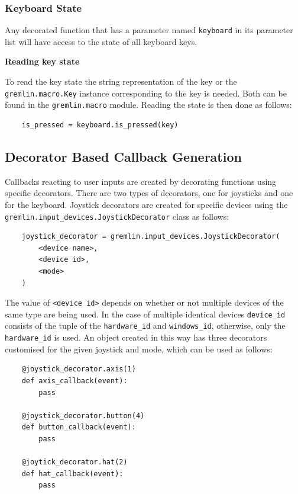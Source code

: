 \documentclass[a4, 10pt]{article}
\begin{document}
\subsubsection{Keyboard State}

Any decorated function that has a parameter named \verb+keyboard+ in its
parameter list will have access to the state of all keyboard keys.

\vspace{1em}
\noindent\textbf{Reading key state}

\noindent To read the key state the string representation of the key or
the \texttt{gremlin.macro.\allowbreak Key} instance corresponding to the
key is needed. Both can be found in the \texttt{gremlin.macro} module.
Reading the state is then done as follows:
\begin{verbatim}
    is_pressed = keyboard.is_pressed(key)
\end{verbatim}


\subsection{Decorator Based Callback Generation}

Callbacks reacting to user inputs are created by decorating functions
using specific decorators. There are two types of decorators, one for
joysticks and one for the keyboard. Joystick decorators are created for
specific devices using the\\
\verb+gremlin.input_devices.JoystickDecorator+ class as follows:
\begin{verbatim}
    joystick_decorator = gremlin.input_devices.JoystickDecorator(
        <device name>,
        <device id>,
        <mode>
    )
\end{verbatim}

The value of \verb+<device id>+ depends on whether or not multiple
devices of the same type are being used. In the case of multiple
identical devices \verb+device_id+ consists of the tuple of the
\verb+hardware_id+ and \verb+windows_id+, otherwise, only the
\verb+hardware_id+ is used. An object created in this way has three
decorators customised for the given joystick and mode, which can be used
as follows:
\begin{verbatim}
    @joystick_decorator.axis(1)
    def axis_callback(event):
        pass

    @joystick_decorator.button(4)
    def button_callback(event):
        pass

    @joytick_decorator.hat(2)
    def hat_callback(event):
        pass
\end{verbatim}
\end{document}
